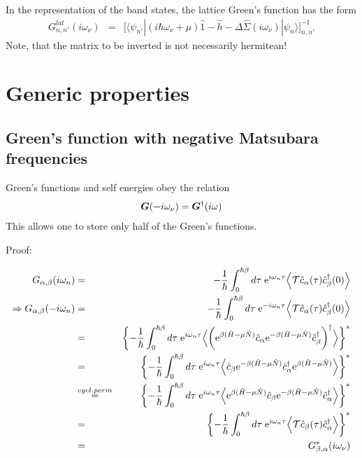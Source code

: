 \documentclass[11pt,a4paper]{report}
\begin{document}
In the representation of the band states, the lattice Green's function
has the form
\begin{eqnarray}
G^{lat}_{n,n'}(i\omega_\nu)&=&
\biggl[\langle\psi_{n'}|(i\hbar\omega_\nu+\mu)\hat{1}-\hat{h}
-\Delta\hat{\Sigma}(i\omega_\nu)|\psi_n\rangle\biggr]_{n,n'}^{-1}
\label{eq:latgreenfuncmat}
\end{eqnarray}
Note, that the matrix to be inverted is not necessarily hermitean!

\section{Generic properties}
\subsection{Green's function with negative Matsubara frequencies}
Green's functions and self energies obey the relation
\begin{eqnarray}
\bm{G}(-i\omega_\nu)=\bm{G}^\dagger(i\omega)
\label{eq:matsubaragnegfreq}
\end{eqnarray}
This allows one to store only half of the Green's functions.

Proof:

\begin{eqnarray}
G_{\alpha,\beta}(i\omega_n)&=&
-\frac{1}{\hbar}\int_0^{\hbar\beta} d\tau\;\mathrm{e}^{i\omega_n\tau}
\Bigl\langle\mathcal{T}\hat{c}_\alpha(\tau)\hat{c}^\dagger_\beta(0)\Bigr\rangle
\\
\Rightarrow
G_{\alpha,\beta}(-i\omega_n)
&=&
-\frac{1}{\hbar}\int_0^{\hbar\beta} d\tau\;\mathrm{e}^{-i\omega_n\tau}
\Bigl\langle\mathcal{T}\hat{c}_\alpha(\tau)\hat{c}^\dagger_\beta(0)\Bigr\rangle
\nonumber\\
&=&
\biggl\lbrace
-\frac{1}{\hbar}\int_0^{\hbar\beta} d\tau\;\mathrm{e}^{i\omega_n\tau}
\Bigl\langle\biggl(\mathrm{e}^{\beta(\hat{H}-\mu\hat{N})}\hat{c}_\alpha
\mathrm{e}^{-\beta(\hat{H}-\mu\hat{N})}\hat{c}^\dagger_\beta\biggr)^\dagger
\Bigr\rangle
\biggr\rbrace^*
\nonumber\\
&=&
\biggl\lbrace
-\frac{1}{\hbar}\int_0^{\hbar\beta} d\tau\;\mathrm{e}^{i\omega_n\tau}
\Bigl\langle
\hat{c}_\beta\mathrm{e}^{-\beta(\hat{H}-\mu\hat{N})}\hat{c}^\dagger_\alpha
\mathrm{e}^{\beta(\hat{H}-\mu\hat{N})}
\Bigr\rangle
\biggr\rbrace^*
\nonumber\\
&\stackrel{cycl. perm}{=}&
\biggl\lbrace
-\frac{1}{\hbar}\int_0^{\hbar\beta} d\tau\;\mathrm{e}^{i\omega_n\tau}
\Bigl\langle
\mathrm{e}^{\beta(\hat{H}-\mu\hat{N})}
\hat{c}_\beta\mathrm{e}^{-\beta(\hat{H}-\mu\hat{N})}\hat{c}^\dagger_\alpha
\Bigr\rangle
\biggr\rbrace^*
\nonumber\\
&=&
\biggl\lbrace
-\frac{1}{\hbar}\int_0^{\hbar\beta} d\tau\;\mathrm{e}^{i\omega_n\tau}
\Bigl\langle
\mathcal{T}\hat{c}_\beta(\tau)\hat{c}^\dagger_\alpha
\Bigr\rangle
\biggr\rbrace^*
\nonumber\\
&=&
G_{\beta,\alpha}^*(i\omega_\nu)
\end{eqnarray}
\end{document}
